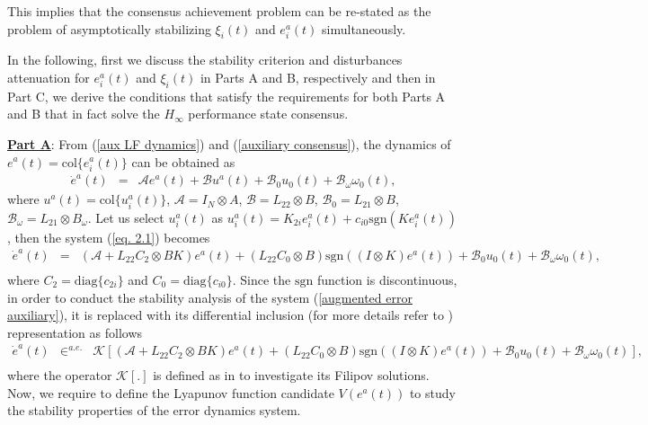 \documentclass[12pt,draftcls,onecolumn]{IEEEtran}
\begin{document}
This implies that the consensus achievement problem can be re-stated as  the problem of asymptotically stabilizing  
$\xi_i(t)$ and $e_i^a(t)$ simultaneously. \par
In the following, first we discuss the stability criterion and disturbances attenuation for  $e_i^a(t)$ and $\xi_i(t)$ in Parts A and B, respectively and  then in Part C, we derive the conditions that  satisfy the requirements for both Parts A and B that in fact solve the $H_{\infty}$ performance state consensus.\par
\underline{\textbf{Part A}}: From  (\ref{aux LF dynamics}) and (\ref{auxiliary consensus}), the dynamics of $e^a(t)=\text{col}\{e_i^a(t)\}$ can be obtained as 
\begin{eqnarray}
\dot e^a(t)&=&\mathcal{A}e^a(t)+\mathcal{B}u^a(t)+\mathcal{B}_0u_0(t)+\mathcal{B}_{\omega}{\omega}_0(t),\label{eq. 2.1}
\end{eqnarray}
where  $u^a(t)=\text{col}\{u_i^a(t)\}$, $\mathcal{A}=I_N\otimes A$, $\mathcal{B}=L_{22}\otimes B$, $\mathcal{B}_0={L}_{21}\otimes B$, $\mathcal{B}_{\omega}={L}_{21}\otimes B_{\omega}$. Let us select $u_i^a(t)$  as $u_i^a(t)=K_{2i}e_i^a(t)+c_{i0}\text{sgn}(Ke_i^a(t))$, then the system (\ref{eq. 2.1}) becomes
\begin{eqnarray}
\dot e^a(t)&=&(\mathcal{A}+L_{22}C_2\otimes BK) e^a(t)+(L_{22}C_0\otimes B)\text{sgn}((I\otimes K)e^a(t))+\mathcal{B}_0u_0(t)+\mathcal{B}_{\omega}{\omega}_0(t),\nonumber\\
\label{augmented error auxiliary}
\end{eqnarray}
where $C_2=\text{diag}\{c_{2i}\}$ and $C_0=\text{diag}\{c_{i0}\}$. Since the $\text{sgn}$ function is discontinuous, in order to conduct  the stability analysis of the system  (\ref{augmented error auxiliary}), it is replaced with its differential inclusion (for more details refer to \cite{Shevitz94,Bacciotti99}) representation as follows 
\begin{eqnarray}
\dot e^a(t)&\in^{a.e.}&\mathcal{K}[(\mathcal{A}+L_{22}C_2\otimes BK) e^a(t)+(L_{22}C_0\otimes B)\text{sgn}((I\otimes K)e^a(t))+\mathcal{B}_0u_0(t)+\mathcal{B}_{\omega}{\omega}_0(t)],\nonumber\\
\label{augmented error auxiliary 1}
\end{eqnarray}
where the operator $\mathcal{K}[.]$ is defined as in \cite{Shevitz94,Bacciotti99} to investigate its Filipov solutions. Now,  we require to define the Lyapunov function candidate $V(e^a(t))$ to study the stability properties of the error dynamics system. 
\end{document}
